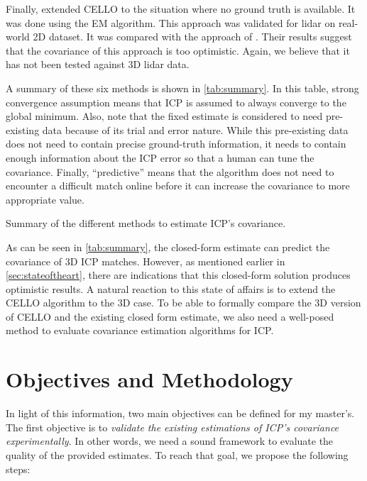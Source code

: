 \documentclass[10pt,letterpaper,oneside]{article}
\begin{document}
Finally, \citet{VegaBrown2013em} extended \ac{CELLO} to the situation where no ground truth is available.
It was done using the \ac{EM} algorithm.
This approach was validated for lidar on real-world 2D dataset.
It was compared with the approach of \citet{Censi2007}.
Their results suggest that the covariance of this approach is too optimistic.
Again, we believe that it has not been tested against 3D lidar data.

A summary of these six methods is shown in \autoref{tab:summary}.
In this table, strong convergence assumption means that \ac{ICP} is assumed to always converge to the global minimum.
Also, note that the fixed estimate is considered to need pre-existing data because of its trial and error nature.
While this pre-existing data does not need to contain precise ground-truth information, it needs to contain enough information about the \ac{ICP} error so that a human can tune the covariance.
Finally, \enquote{predictive} means that the algorithm does not need to encounter a difficult match online before it can increase the covariance to more appropriate value.

\begin{table}[htbp]
\centering
\caption{Summary of the different methods to estimate \ac{ICP}'s covariance.}

\label{tab:summary}
\end{table}

As can be seen in \autoref{tab:summary}, the closed-form estimate can predict the covariance of 3D \ac{ICP} matches.
However, as mentioned earlier in \autoref{sec:stateoftheart}, there are indications that this closed-form solution produces optimistic results.
A natural reaction to this state of affairs is to extend the \ac{CELLO} algorithm to the 3D case.
To be able to formally compare the 3D version of \ac{CELLO} and the existing closed form estimate, we also need a well-posed method to evaluate covariance estimation algorithms for \ac{ICP}.


\section{Objectives and Methodology}
\label{sec:objectives}

In light of this information, two main objectives can be defined for my master's.
The first objective is to \emph{validate the existing estimations of \ac{ICP}'s covariance experimentally}.
In other words, we need a sound framework to evaluate the quality of the provided estimates.
To reach that goal, we propose the following steps:
\end{document}
